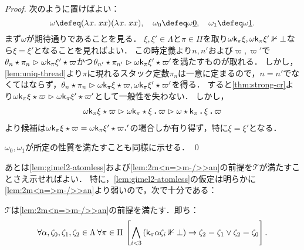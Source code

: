 \documentclass[realisability.tex]{subfiles}
\begin{document}
\begin{proof}
 次のように置けばよい：
 \[
  \omega \defeq (\abs{x}{xx})(\abs{x}{xx}), \quad
  \omega_0 \defeq \omega \num{0}, \quad
  \omega_1 \defeq \omega \num{1}.
 \]
 まず$\omega$が期待通りであることを見る．
 $\xi, \xi' \in \Lambda$と$\pi \in \Pi$を取り$\omega \mathsf{k}_\pi \xi, \omega \mathsf{k}_\pi \xi' \nVdash \bot$なら$\xi = \xi'$となることを見ればよい．
 この時定義より$n, n'$および$\varpi, \varpi'$で$\theta_n \mathbin{\star} \pi_n \mathrel{\rhd} \omega \mathsf{k}_\pi \xi' \mathbin{\star} \varpi$かつ$\theta_{n'} \mathbin{\star} \pi_{n'} \mathrel{\rhd} \omega \mathsf{k}_\pi \xi' \mathbin{\star} \varpi'$を満たすものが取れる．
 しかし，\cref{lem:uniq-thread}より$\pi$に現れるスタック定数$\pi_n$は一意に定まるので，$n = n'$でなくてはならず，$\theta_n \mathbin{\star} \pi_n \mathrel{\rhd} \omega \mathsf{k}_\pi \xi \mathbin{\star} \varpi, \omega \mathsf{k}_\pi \xi' \mathbin{\star} \varpi'$を得る．
 すると\cref{thm:strong-cr}より$\omega \mathsf{k}_\pi \xi \mathbin{\star} \varpi \mathrel{\rhd} \omega \mathsf{k}_\pi \xi' \mathbin{\star} \varpi'$として一般性を失わない．
 しかし，
 \begin{align*}
   \KVM{{{\omega \conti_\pi \xi}} \varpi}
  \reds
  \KVM{{{\omega \conti_\pi}} \xi \varpi}
  \reds
  \KVM{{{\omega}} {{\conti_\pi}} \xi \varpi}
 \end{align*} 
 より候補は$\KVM{{{\omega \conti_\pi \xi}}{\varpi}} = \KVM{{{\omega \conti_\pi \xi'}}{\varpi'}}$の場合しか有り得ず，特に$\xi = \xi'$となる．

 $\omega_0, \omega_1$が所定の性質を満たすことも同様に示せる． \qed
\end{proof}
あとは\cref{lem:gimel2-atomless}および\cref{lem:2m<n=>m-/>>an}の前提を$\mathcal{T}$が満たすことさえ示せればよい．
特に，\cref{lem:gimel2-atomless}の仮定は明らかに\cref{lem:2m<n=>m-/>>an}より弱いので，次で十分である：
\begin{lemma}
 $\mathcal{T}$は\cref{lem:2m<n=>m-/>>an}の前提を満たす．即ち：
 \[
  \forall \alpha, \zeta_0, \zeta_1, \zeta_2 \in \Lambda\:
  \forall \pi \in \Pi\:
 \left[ \bigwedge_{i < 3} \left(\mathsf{k}_\pi \alpha \zeta_i \nVdash \bot\right) \to \zeta_2 = \zeta_1 \vee \zeta_2 = \zeta_0 \right].
 \]
\end{lemma}
\end{document}
